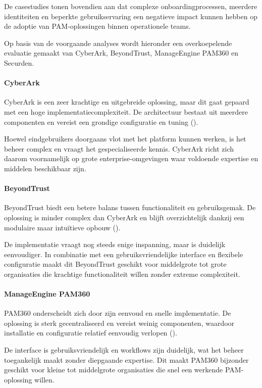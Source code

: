 De casestudies tonen bovendien aan dat complexe onboardingprocessen, meerdere identiteiten en beperkte gebruikservaring een negatieve impact kunnen hebben op de adoptie van PAM-oplossingen binnen operationele teams.

Op basis van de voorgaande analyses wordt hieronder een overkoepelende evaluatie gemaakt van CyberArk, BeyondTrust, ManageEngine PAM360 en Securden.

\paragraph{CyberArk}
CyberArk is een zeer krachtige en uitgebreide oplossing, maar dit gaat gepaard met een hoge implementatiecomplexiteit. De architectuur bestaat uit meerdere componenten en vereist een grondige configuratie en tuning (\cite{cyberark_pam_architecture}).

Hoewel eindgebruikers doorgaans vlot met het platform kunnen werken, is het beheer complex en vraagt het gespecialiseerde kennis. CyberArk richt zich daarom voornamelijk op grote enterprise-omgevingen waar voldoende expertise en middelen beschikbaar zijn.
\paragraph{BeyondTrust}
BeyondTrust biedt een betere balans tussen functionaliteit en gebruiksgemak. De oplossing is minder complex dan CyberArk en blijft overzichtelijk dankzij een modulaire maar intuïtieve opbouw (\cite{beyondtrust_architecture}).

De implementatie vraagt nog steeds enige inspanning, maar is duidelijk eenvoudiger. In combinatie met een gebruiksvriendelijke interface en flexibele configuratie maakt dit BeyondTrust geschikt voor middelgrote tot grote organisaties die krachtige functionaliteit willen zonder extreme complexiteit.
\paragraph{ManageEngine PAM360}
PAM360 onderscheidt zich door zijn eenvoud en snelle implementatie. De oplossing is sterk gecentraliseerd en vereist weinig componenten, waardoor installatie en configuratie relatief eenvoudig verlopen (\cite{pam360_architecture}).

De interface is gebruiksvriendelijk en workflows zijn duidelijk, wat het beheer toegankelijk maakt zonder diepgaande expertise. Dit maakt PAM360 bijzonder geschikt voor kleine tot middelgrote organisaties die snel een werkende PAM-oplossing willen.
